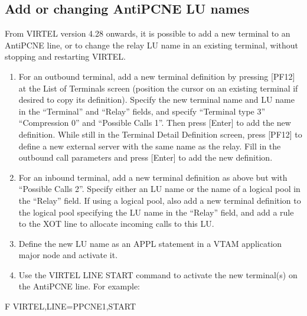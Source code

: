 \documentclass[letterpaper,10pt,english]{sphinxmanual}
\begin{document}
\subsection{Add or changing AntiPCNE LU names}
\label{\detokenize{connectivity_guide:add-or-changing-antipcne-lu-names}}\label{\detokenize{connectivity_guide:index-86}}
\sphinxAtStartPar
From VIRTEL version 4.28 onwards, it is possible to add a new terminal to an AntiPCNE line, or to change the relay LU name in an existing terminal, without stopping and restarting VIRTEL.

\sphinxAtStartPar
{}
\begin{enumerate}
%
\item {} 
\sphinxAtStartPar
For an outbound terminal, add a new terminal definition by pressing {[}PF12{]} at the List of Terminals screen (position the cursor on an existing terminal if desired to copy its definition). Specify the new terminal name and LU name in the “Terminal” and “Relay” fields, and specify “Terminal type 3” “Compression 0” and “Possible Calls 1”. Then press {[}Enter{]} to add the new definition. While still in the Terminal Detail Definition screen, press {[}PF12{]} to define a new external server with the same name as the relay. Fill in the outbound   call parameters and press {[}Enter{]} to add the new definition.

\item {} 
\sphinxAtStartPar
For an inbound terminal, add a new terminal definition as above but with “Possible Calls 2”. Specify either an LU name or the name of a logical pool in the “Relay” field. If using a logical pool, also add a new terminal definition to the logical pool specifying the LU name in the “Relay” field, and add a rule to the XOT line to allocate incoming calls to this LU.

\item {} 
\sphinxAtStartPar
Define the new LU name as an APPL statement in a VTAM application major node and activate it.

\item {} 
\sphinxAtStartPar
Use the VIRTEL LINE START command to activate the new terminal(s) on the AntiPCNE line. For example:

\end{enumerate}
\begin{description}
\sphinxlineitem{::}
\sphinxAtStartPar
F VIRTEL,LINE=P\sphinxhyphen{}PCNE1,START

\end{description}
\end{document}
